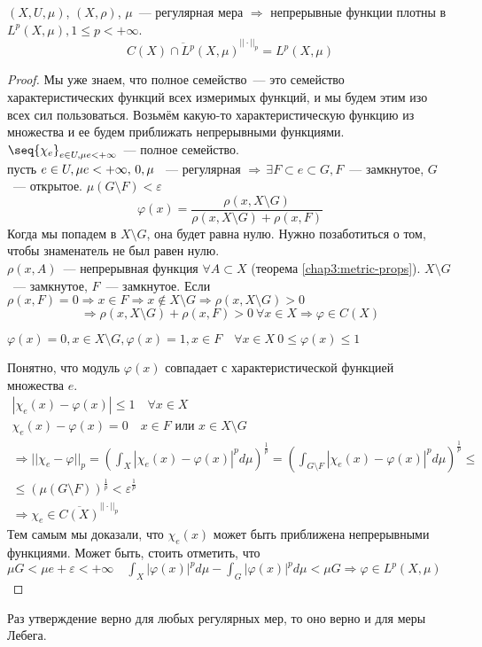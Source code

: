 \documentclass[document]{subfiles}
\begin{document}
\begin{theorem}
    $(X, U, \mu)$, $(X, \rho)$, $\mu$~--- регулярная мера $\Rightarrow$  непрерывные функции плотны в
    $L^p(X, \mu), 1 \leq p < + \infty$.
    \[ \overline{C(X) \cap L^p(X,\mu)}^{|| \cdot ||_p} = L^p(X, \mu) \]
\end{theorem}
\begin{proof}
    Мы уже знаем, что полное семейство~--- это семейство характеристических функций всех
    измеримых функций, и мы будем этим изо всех сил пользоваться. Возьмём какую-то характеристическую функцию из множества и ее будем приближать
    непрерывными функциями. \\
    $\seq{ \chi_e}_{e \in U, \mu e < + \infty }$~--- полное семейство. \\
    пусть $ e \in U, \mu e < + \infty, \, \let \varepsilon > 0, \mu$ ~--- регулярная $\Rightarrow 
    \, \exists F \subset e \subset G, F$~--- замкнутое, $G$~--- открытое. $\mu(G \setminus F) < \varepsilon$
    \[ \varphi(x) = \frac{\rho(x, X \setminus G)}{\rho(x, X \setminus G) + \rho(x, F)} \]
    Когда мы попадем в $X \setminus G$, она будет равна нулю.
    Нужно позаботиться о том, чтобы знаменатель не был равен нулю. \\
    $\rho(x,A)$~--- непрерывная функция $\forall A \subset X$ (теорема \ref{chap3:metric-props}). $X \setminus G$~--- замкнутое, $F$~--- замкнутое.
    Если $\rho(x, F) = 0 \Rightarrow x \in F \Rightarrow x \notin X \setminus G \Rightarrow \rho(x, X \setminus G) > 0$ 
    \[ \Rightarrow \rho(x, X \setminus G) + \rho(x, F) > 0 \: \forall x \in X \Rightarrow \varphi \in C(X) \]

    $\varphi(x) = 0, x \in X \setminus G, \varphi(x) = 1, x \in F \quad \forall x \in X \: 0 \leq \varphi(x) \leq 1$

    Понятно, что модуль $\varphi(x)$ совпадает с характеристической функцией множества $e$.
    \begin{gather*}
        |\chi_e(x) - \varphi(x)| \leq 1 \quad \forall x \in X \\
        \chi_e(x) - \varphi(x) = 0 \quad x \in F \text{ или } x \in X \setminus G \\
        \Rightarrow ||\chi_e - \varphi||_p = \left( \int_X |\chi_e(x) - \varphi(x) |^p d\mu \right)^{\frac{1}{p}} = 
        \left( \int_{G \setminus F} |\chi_e(x) - \varphi(x) |^p d \mu \right)^{\frac{1}{p}} \leq \\
        \leq \left( \mu(G \setminus F) \right)^{\frac{1}{p}} < \varepsilon^{\frac{1}{p}} \\
        \Rightarrow \chi_e \in \overline{C(X)}^{|| \cdot||_p}
    \end{gather*}
    Тем самым мы доказали, что $\chi_e(x)$ может быть приближена непрерывными функциями.
    Может быть, стоить отметить, что 
    $\mu G < \mu e + \varepsilon < +\infty \quad \int_X |\varphi(x)|^p d \mu - \int_G |\varphi(x)|^p d \mu < \mu G \Rightarrow
    \varphi \in L^p(X, \mu)$
    
\end{proof}


Раз утверждение верно для любых регулярных мер, то оно верно и для меры Лебега.
\end{document}
